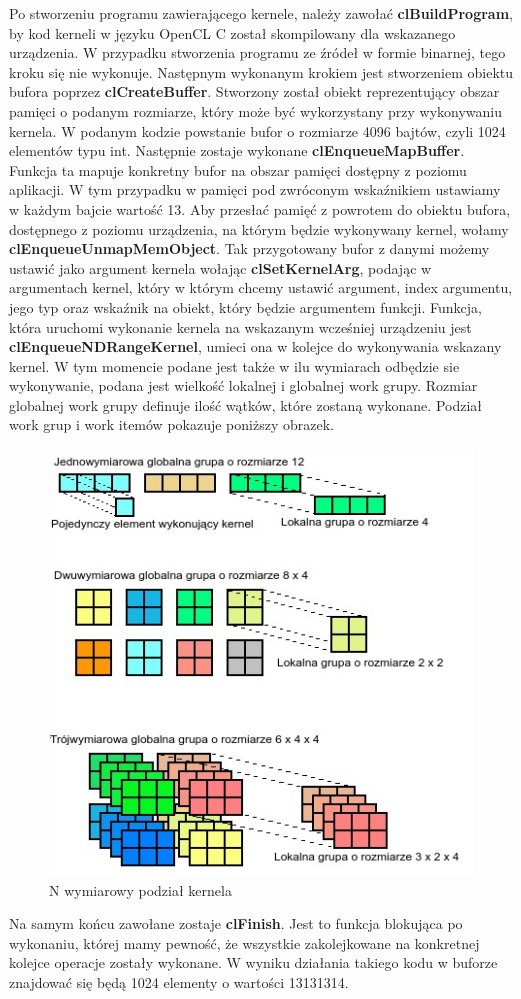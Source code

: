Po stworzeniu programu zawierającego kernele, należy zawołać \textbf{clBuildProgram}, by kod kerneli w języku OpenCL C został skompilowany dla wskazanego urządzenia. W przypadku stworzenia programu ze źródeł w formie binarnej, tego kroku się nie wykonuje.
Następnym wykonanym krokiem jest stworzeniem obiektu bufora poprzez \textbf{clCreateBuffer}. Stworzony został obiekt reprezentujący obszar pamięci o podanym rozmiarze, który może być wykorzystany przy wykonywaniu kernela. W podanym kodzie powstanie bufor o rozmiarze 4096 bajtów, czyli 1024 elementów typu int.
Następnie zostaje wykonane \textbf{clEnqueueMapBuffer}. Funkcja ta mapuje konkretny bufor na obszar pamięci dostępny z poziomu aplikacji. W tym przypadku w pamięci pod zwróconym wskaźnikiem ustawiamy w każdym bajcie wartość 13.
Aby przesłać pamięć z powrotem do obiektu bufora, dostępnego z poziomu urządzenia, na którym będzie wykonywany kernel, wołamy \textbf{clEnqueueUnmapMemObject}.
Tak przygotowany bufor z danymi możemy ustawić jako argument kernela wołając \textbf{clSetKernelArg}, podając w argumentach kernel, który w którym chcemy ustawić argument, index argumentu, jego typ oraz wskaźnik na obiekt, który będzie argumentem funkcji.
Funkcja, która uruchomi wykonanie kernela na wskazanym wcześniej urządzeniu jest \textbf{clEnqueueNDRangeKernel}, umieci ona w kolejce do wykonywania wskazany kernel. W tym momencie podane jest także w ilu wymiarach odbędzie sie wykonywanie, podana jest wielkość lokalnej i globalnej work grupy. Rozmiar globalnej work grupy definuje ilość wątków, które zostaną wykonane. Podział work grup i work itemów pokazuje poniższy obrazek.
\begin{figure}[H]
	\includegraphics[scale=0.7]{imgs/KernelDispatch.jpg}
	\caption{N wymiarowy podział kernela}
\end{figure}
Na samym końcu zawołane zostaje \textbf{clFinish}. Jest to funkcja blokująca po wykonaniu, której mamy pewność, że wszystkie zakolejkowane na konkretnej kolejce operacje zostały wykonane.
W wyniku działania takiego kodu w buforze znajdować się będą 1024 elementy o wartości 13131314.
